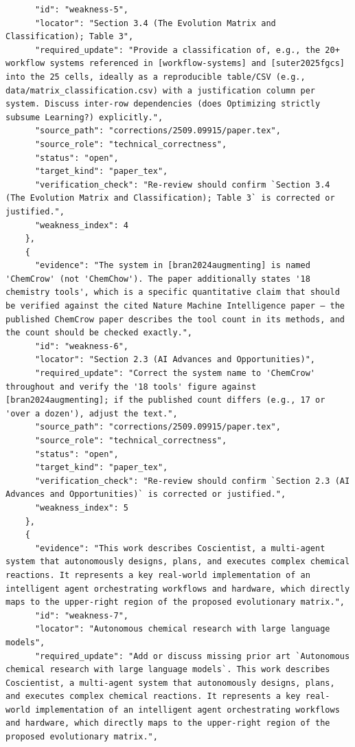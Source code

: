 \documentclass[11pt]{article}
\begin{document}
\begin{verbatim}
      "id": "weakness-5",
      "locator": "Section 3.4 (The Evolution Matrix and Classification); Table 3",
      "required_update": "Provide a classification of, e.g., the 20+ workflow systems referenced in [workflow-systems] and [suter2025fgcs] into the 25 cells, ideally as a reproducible table/CSV (e.g., data/matrix_classification.csv) with a justification column per system. Discuss inter-row dependencies (does Optimizing strictly subsume Learning?) explicitly.",
      "source_path": "corrections/2509.09915/paper.tex",
      "source_role": "technical_correctness",
      "status": "open",
      "target_kind": "paper_tex",
      "verification_check": "Re-review should confirm `Section 3.4 (The Evolution Matrix and Classification); Table 3` is corrected or justified.",
      "weakness_index": 4
    },
    {
      "evidence": "The system in [bran2024augmenting] is named 'ChemCrow' (not 'ChemChow'). The paper additionally states '18 chemistry tools', which is a specific quantitative claim that should be verified against the cited Nature Machine Intelligence paper — the published ChemCrow paper describes the tool count in its methods, and the count should be checked exactly.",
      "id": "weakness-6",
      "locator": "Section 2.3 (AI Advances and Opportunities)",
      "required_update": "Correct the system name to 'ChemCrow' throughout and verify the '18 tools' figure against [bran2024augmenting]; if the published count differs (e.g., 17 or 'over a dozen'), adjust the text.",
      "source_path": "corrections/2509.09915/paper.tex",
      "source_role": "technical_correctness",
      "status": "open",
      "target_kind": "paper_tex",
      "verification_check": "Re-review should confirm `Section 2.3 (AI Advances and Opportunities)` is corrected or justified.",
      "weakness_index": 5
    },
    {
      "evidence": "This work describes Coscientist, a multi-agent system that autonomously designs, plans, and executes complex chemical reactions. It represents a key real-world implementation of an intelligent agent orchestrating workflows and hardware, which directly maps to the upper-right region of the proposed evolutionary matrix.",
      "id": "weakness-7",
      "locator": "Autonomous chemical research with large language models",
      "required_update": "Add or discuss missing prior art `Autonomous chemical research with large language models`. This work describes Coscientist, a multi-agent system that autonomously designs, plans, and executes complex chemical reactions. It represents a key real-world implementation of an intelligent agent orchestrating workflows and hardware, which directly maps to the upper-right region of the proposed evolutionary matrix.",

\end{verbatim}
\end{document}
